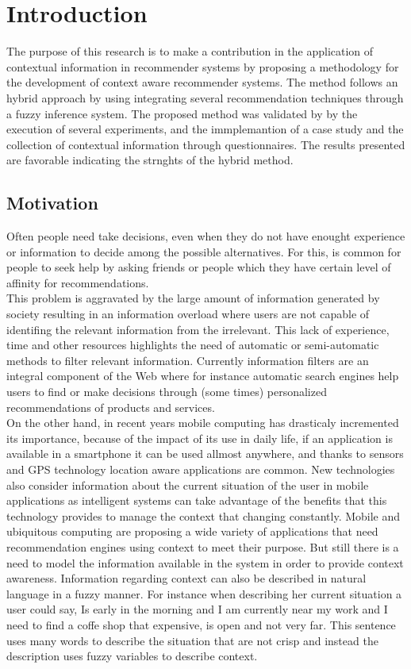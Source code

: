 \chapter{Introduction} \label{introduction} 

The purpose of this research is to make a contribution in the 
application of contextual information in recommender systems by proposing a methodology for
the development of context aware recommender systems.
The method follows an hybrid  approach by using integrating several
recommendation techniques through a
fuzzy inference system. The proposed method was validated by 
by the execution of several experiments, and the immplemantion of
a case study and the collection of contextual
information through questionnaires. The results presented are favorable 
indicating the strnghts of the hybrid method.

\section{Motivation}

Often people need take decisions, even when they do not
have enought experience or information to decide among the possible alternatives. 
For this, is common for people to seek help by asking friends or people which they  
have certain level of affinity for recommendations.\\
This problem is aggravated by the large amount of information generated by society 
resulting in an information overload where users are not capable of
identifing the relevant information from the irrelevant.
This lack of experience, time and other resources 
highlights the need of automatic or semi-automatic methods 
to filter relevant information. Currently information filters are
an integral component of the Web where for instance
automatic search engines help users to find or make decisions through 
(some times) personalized recommendations
of products and services. \\ On the other hand, in recent
years  mobile computing has drasticaly incremented its importance, 
because of the impact of its use in daily life, if an application 
is available in a smartphone it can be used allmost anywhere, and thanks
to sensors and GPS technology location aware applications are common.
New technologies also consider information about the current situation of the
user in mobile applications as intelligent systems can take advantage of the
benefits that this technology provides to manage the context that changing
constantly. Mobile and ubiquitous computing\cite{noguera2012mobile}
\cite{chiou2010adaptive} are proposing a wide variety of applications
that need recommendation engines using context to meet their
purpose. But still there is a need to model the information available in
the system in order to provide context awareness. Information regarding 
context can also be described in natural language in a fuzzy manner. For
instance when describing her current situation a user could say, Is early in
the morning and I am currently near my work and I need to find a coffe
shop that expensive, is open and not very far. This sentence uses many words to describe
the situation that are not crisp and instead the description uses fuzzy variables
to describe context.   


